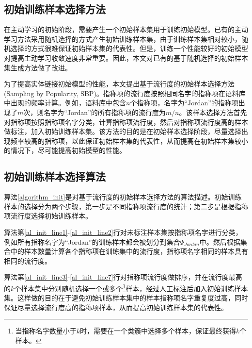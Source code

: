 \subsection{初始训练样本选择方法}
在主动学习的初始阶段，需要产生一个初始样本集用于训练初始模型。已有的主动学习方法采用随机选择的方式产生初始训练样本集，由于训练样本集相对较小，随机选择的方式很难保证初始样本集的代表性。但是，训练一个性能较好的初始模型对提高主动学习收敛速度非常重要。因此，本文对已有的基于随机选择的初始样本集生成方法做了改进。

为了提高实体链接初始模型的性能，本文提出基于流行度的初始样本选择方法(Sampling by Popularity, SBP)。指称项的流行度按照相同名字的指称项在语料库中出现的频率计算。例如，语料库中包含$n$个指称项，名字为“Jordan”的指称项出现了$m$次，则名字为“Jordan”的所有指称项的流行度为$m/n$。该样本选择方法首先对指称项按照指称项名字分类，计算指称项流行度，然后对指称项流行度高的样本做标注，加入初始训练样本集。该方法的目的是在初始样本选择阶段，尽量选择出现频率较高的指称项，以此保证初始样本集的代表性，从而提高在初始样本集较小的情况下，尽可能提高初始模型的性能。

\subsection{初始训练样本选择算法}
算法\ref{algorithm_init}是对基于流行度的初始样本选择方法的算法描述。初始训练样本的选择分为两个步骤，第一步是不同指称项流行度的统计；第二步是根据指称项流行度选择初始训练样本。

算法第\ref{al_init_line1}-\ref{al_init_line2}行对未标注样本集按指称项名字进行分类，例如所有指称名字为“Jordan”的训练样本都会被划分到集合$\Psi_{Jordan}$中。然后根据集合中的样本数量计算各个指称项在训练集中的流行度，指称项名字相同的样本具有相同的流行度。

算法第\ref{al_init_line3}-\ref{al_init_line7}行对指称项流行度做排序，并在流行度最高的$k$个样本集中分别随机选择一个或多个\footnote{当指称名字数量小于$k$时，需要在一个类簇中选择多个样本，保证最终获得$k$个样本。}样本，经过人工标注后加入初始训练样本集。这样做的目的在于避免初始训练样本集中的样本指称项名字重复度过高，同时保证尽量选择流行度高的指称项样本，从而提高初始训练样本集的代表性。

